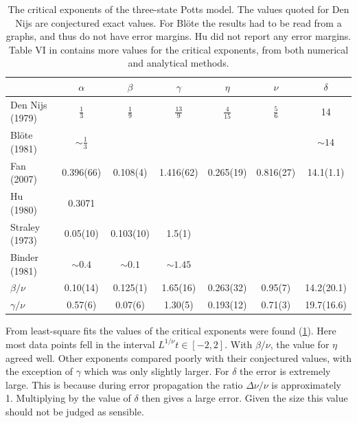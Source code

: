 \documentclass[11pt, a4paper]{report} %
\begin{document}
\begin{table}[htb]
	\begin{adjustbox}{center}
		\centering
		\renewcommand{\arraystretch}{1.5}
		\begin{tabular}{l | c c c c c c}
			\hline
			& \(\alpha\) & \(\beta\) & \(\gamma\) & \(\eta\) & \(\nu\) & \(\delta\) \\\hline
			Den Nijs (1979) \cite{nijs:1979,baxter:1989} & \(\frac{1}{3}\) & \(\frac{1}{9}\) & \(\frac{13}{9}\) & \(\frac{4}{15}\) & \(\frac{5}{6}\) & 14 \\
			Blöte (1981) \cite{blote:1981} & \(\sim\frac{1}{3}\) & & & & & \(\sim14\)\\
			Fan (2007) \cite{fan:2007} & 0.396(66) & 0.108(4) & 1.416(62) & 0.265(19) & 0.816(27) & 14.1(1.1) \\
			Hu (1980) \cite{hu:1980} & 0.3071 & \\
			Straley (1973) \cite{straley:1973} & 0.05(10)& 0.103(10) & 1.5(1)\\
			Binder (1981) \cite{binder:1981a} & \(\sim0.4\) & \(\sim0.1\) & \(\sim1.45\)\\
			\(\beta/\nu\) & 0.10(14) & 0.125(1) & 1.65(16) & 0.263(32) & 0.95(7) & 14.2(20.1)\\
			\(\gamma/\nu\) & 0.57(6) & 0.07(6) & 1.30(5) & 0.193(12) & 0.71(3) & 19.7(16.6)\\\hline
		\end{tabular}
	\end{adjustbox}
	\caption{The critical exponents of the three-state Potts model. The values quoted for Den Nijs are conjectured exact values. For Blöte the results had to be read from a graphs, and thus do not have error margins. Hu did not report any error margins.
	Table VI in \cite{wu:1982} contains more values for the critical exponents, from both numerical and analytical methods.}
	\label{tab:potts_critical_exponents}
\end{table}

From least-square fits the values of the critical exponents were found (\cref{tab:potts_critical_exponents}).
Here most data points fell in the interval \(L^{1/\nu}t \in [-2, 2]\).
With \(\beta/\nu\), the value for \(\eta\) agreed well.
Other exponents compared poorly with their conjectured values, with the exception of \(\gamma\) which was only slightly larger.
For \(\delta\) the error is extremely large. This is because during error propagation the ratio \(\Delta \nu / \nu\) is approximately 1.
Multiplying by the value of \(\delta\) then gives a large error.
Given the size this value should not be judged as sensible.
\end{document}
